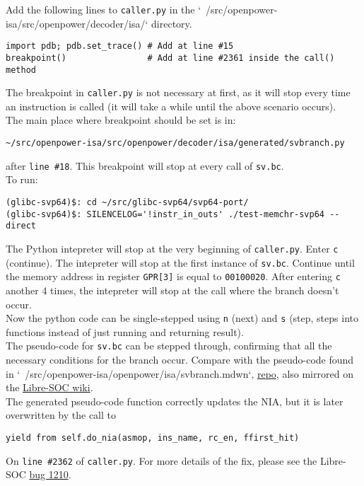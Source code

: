 Add the following lines to \texttt{caller.py} in the
`~/src/openpower-isa/src/openpower/decoder/isa/` directory.
\begin{verbatim}
import pdb; pdb.set_trace() # Add at line #15
breakpoint()                # Add at line #2361 inside the call() method
\end{verbatim}

The breakpoint in \texttt{caller.py} is not necessary at first, as it will
stop every time an instruction is called (it will take a while until the
above scenario occurs).\\

The main place where breakpoint should be set is in:

\begin{verbatim}
~/src/openpower-isa/src/openpower/decoder/isa/generated/svbranch.py
\end{verbatim}

after \texttt{line \#18}. This breakpoint will stop at
every call of \texttt{sv.bc}.\\

To run:
\begin{verbatim}
(glibc-svp64)$: cd ~/src/glibc-svp64/svp64-port/
(glibc-svp64)$: SILENCELOG='!instr_in_outs' ./test-memchr-svp64 --direct
\end{verbatim}

The Python intepreter will stop at the very beginning of \texttt{caller.py}.
Enter \texttt{c} (continue). The intepreter will stop at the first instance
of \texttt{sv.bc}. Continue until the memory address in register
\texttt{GPR[3]} is equal to \texttt{00100020}.
After entering \texttt{c} another 4 times, the intepreter will stop at the
call where the branch doesn't occur.\\

Now the python code can be single-stepped using \texttt{n} (next) and
\texttt{s} (step, steps into functions instead of just running
and returning result).\\

The pseudo-code for \texttt{sv.bc} can be stepped through,
confirming that all the necessary conditions for the branch occur.
Compare with the pseudo-code found in
`~/src/openpower-isa/openpower/isa/svbranch.mdwn`,
\href{https://git.libre-soc.org/?p=openpower-isa.git;a=blob;f=openpower/isa/svbranch.mdwn;h=e8b46e7700b44c6112ee2d873cc2e04b3c732370;hb=089e6d352ec57be4ab645d18ad9e95df3af0d365}{repo},
also mirrored on the
\href{https://libre-soc.org/openpower/isa/svbranch/}{Libre-SOC wiki}.\\

The generated pseudo-code function correctly updates the \acrfull{NIA},
but it is later overwritten by the call to 
\begin{verbatim}
yield from self.do_nia(asmop, ins_name, rc_en, ffirst_hit)
\end{verbatim}

On \texttt{line \#2362} of \texttt{caller.py}. For more details of the fix,
please see the Libre-SOC
\href{https://bugs.libre-soc.org/show_bug.cgi?id=1210}{bug 1210}.
